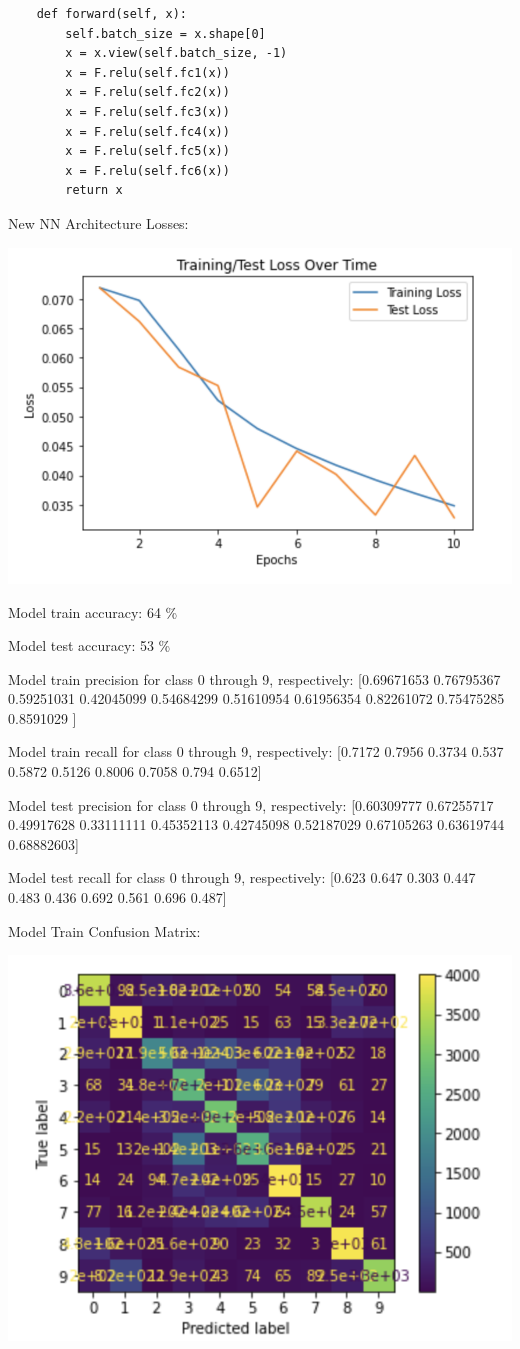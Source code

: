 \documentclass[submit]{harvardml}
\begin{document}
\begin{enumerate}
\begin{lstlisting}
    def forward(self, x):
        self.batch_size = x.shape[0]
        x = x.view(self.batch_size, -1)
        x = F.relu(self.fc1(x))
        x = F.relu(self.fc2(x))
        x = F.relu(self.fc3(x))
        x = F.relu(self.fc4(x))
        x = F.relu(self.fc5(x))
        x = F.relu(self.fc6(x))
        return x
\end{lstlisting}

New NN Architecture Losses:

\includegraphics[width=.7\textwidth]{newlosses.png}

Model train accuracy: 64 \%

Model test accuracy: 53 \%

Model train precision for class 0 through 9, respectively: [0.69671653 0.76795367 0.59251031 0.42045099 0.54684299 0.51610954
 0.61956354 0.82261072 0.75475285 0.8591029 ]
 
Model train recall for class 0 through 9, respectively: [0.7172 0.7956 0.3734 0.537  0.5872 0.5126 0.8006 0.7058 0.794  0.6512]

Model test precision for class 0 through 9, respectively: [0.60309777 0.67255717 0.49917628 0.33111111 0.45352113 0.42745098
 0.52187029 0.67105263 0.63619744 0.68882603]
 
Model test recall for class 0 through 9, respectively: [0.623 0.647 0.303 0.447 0.483 0.436 0.692 0.561 0.696 0.487]

Model Train Confusion Matrix:

\includegraphics[width=.7\textwidth]{newtrainconfusion.png}


\end{enumerate}
\end{document}
